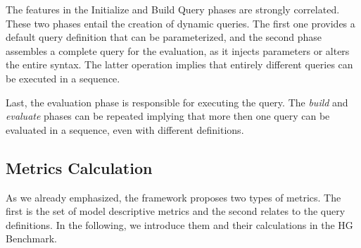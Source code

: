 The features in the \textsf{Initialize} and \textsf{Build Query} phases are strongly correlated. These two phases entail the creation of dynamic queries. The first one provides a default query definition that can be parameterized, and the second phase assembles a complete query for the evaluation, as it injects parameters or alters the entire syntax. The latter operation implies that entirely different queries can be executed in a sequence.

Last, the evaluation phase is responsible for executing the query. The \emph{build} and \emph{evaluate} phases can be repeated implying that more then one query can be evaluated in a sequence, even with different definitions.

\subsection{Metrics Calculation}
As we already emphasized, the \framework framework proposes two types of metrics. The first is the set of model descriptive metrics and the second relates to the query definitions. In the following, we introduce them and their calculations in the HG Benchmark.

